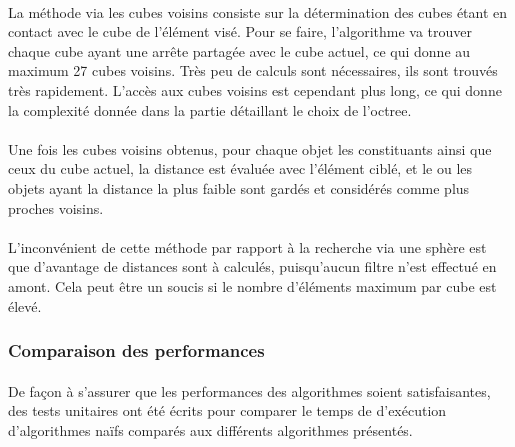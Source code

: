 \paragraph{}
La méthode via les cubes voisins consiste sur la détermination des cubes étant
en contact avec le cube de l'élément visé. Pour se faire, l'algorithme va
trouver chaque cube ayant une arrête partagée avec le cube actuel, ce qui donne
au maximum 27 cubes voisins. Très peu de calculs sont nécessaires, ils sont
trouvés très rapidement. L'accès aux cubes voisins est cependant plus long, ce
qui donne la complexité donnée dans la partie détaillant le choix de l'octree.

\paragraph{}
Une fois les cubes voisins obtenus, pour chaque objet les constituants ainsi
que ceux du cube actuel, la distance est évaluée avec l'élément ciblé, et le ou
les objets ayant la distance la plus faible sont gardés et considérés comme
plus proches voisins.

\paragraph{}
L'inconvénient de cette méthode par rapport à la recherche via une sphère est
que d'avantage de distances sont à calculés, puisqu'aucun filtre n'est effectué
en amont. Cela peut être un soucis si le nombre d'éléments maximum par cube est
élevé.

\subsubsection{Comparaison des performances}
\paragraph{}
De façon à s'assurer que les performances des algorithmes soient
satisfaisantes, des tests unitaires ont été écrits pour comparer le temps de
d'exécution d'algorithmes naïfs comparés aux différents algorithmes présentés.

